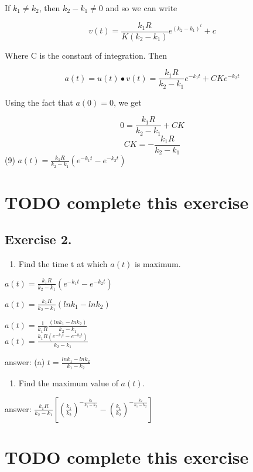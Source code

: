 \documentclass[]{article}
\providecommand{\tightlist}{%
  \setlength{\itemsep}{0pt}\setlength{\parskip}{0pt}}
\begin{document}
If \(k_1 \neq k_2\), then \(k_2 - k _1 \neq 0\) and so we can write

\[v(t) = \frac{k_1R}{K(k_2 - k_1)}e^(k_2 -k_1)^t +c\]

Where C is the constant of integration. Then

\[a(t) = u(t) \bullet v(t) = \frac{k_1R}{k_2-k_1}e^{-k_1t} + CKe^{-k_2t}\]

Using the fact that \(a(0) = 0\), we get

\[0 = \frac{k_1R}{k_2-k_1} + CK\] \[CK = -\frac{k_1R}{k_2-k_1}\] (9)
\(a(t) = \frac{k_1R}{k_2-k_1}(e^{-k_1t} - e^{-k_2t})\)

\section{TODO complete this exercise}\label{todo-complete-this-exercise}

\subsection{Exercise 2.}\label{exercise-2.}

\begin{enumerate}
\def\labelenumi{(\alph{enumi})}
\tightlist
\item
  Find the time t at which \(a(t)\) is maximum.
\end{enumerate}

\(a(t) = \frac{k_1R}{k_2-k_1}(e^{-k_1t}-e^{-k_2t})\)

\(a(t) = \frac{k_1R}{k_2-k_1}(lnk_1-lnk_2)\)

\(a(t) = \frac{1}{k_1R}\frac{(lnk_1-lnk_2)}{k_2-k_1}\)\\
\(a(t) = \frac{k_1R(e^{-k_1t}-e^{-k_2t})}{k_2-k_1}\)

answer: (a) \(t = \frac{lnk_1-lnk_2}{k_1-k_2}\)

\begin{enumerate}
\def\labelenumi{(\alph{enumi})}
\setcounter{enumi}{1}
\tightlist
\item
  Find the maximum value of \(a(t)\).
\end{enumerate}

answer:
\(\frac{k_1R}{k_2-k_1}[(\frac{k_1}{k_2})^{-\frac{k_1}{k_1-k_2}}-(\frac{k_1}{k_2})^{-\frac{k_2}{k_1-k_2}}]\)

\section{TODO complete this
exercise}\label{todo-complete-this-exercise-1}
\end{document}
